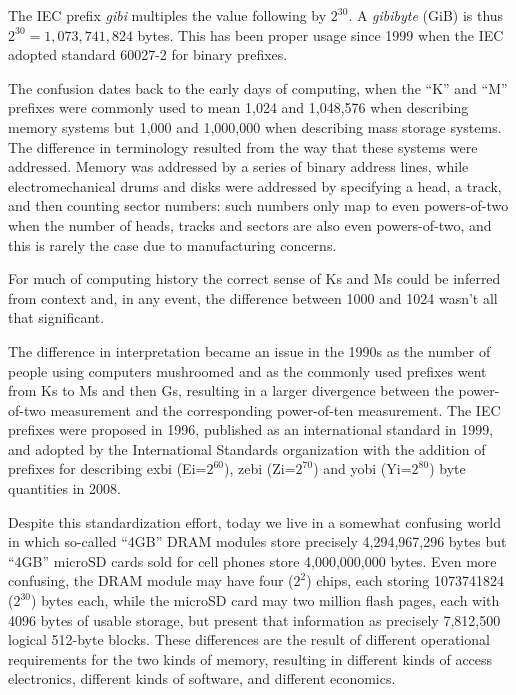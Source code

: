 The IEC prefix \emph{gibi} multiples the value following by $2^{30}$. A \emph{gibibyte}
(GiB) is thus $2^{30}=1,073,741,824$ bytes. This has been proper usage
since 1999 when the IEC adopted standard 60027-2 for binary prefixes.

The confusion dates back to the early days of computing, when the ``K''
and ``M'' prefixes were commonly used to mean 1,024 and 1,048,576
when describing memory systems but 1,000 and 1,000,000 when
describing mass storage systems. The difference in terminology resulted
from the way that these systems were addressed. Memory was addressed
by a series of binary address lines, while electromechanical drums and
disks were addressed by specifying a head, a track, and then counting
sector numbers: such numbers only map to even powers-of-two when the
number of heads, tracks and sectors are also even powers-of-two, and
this is rarely the case due to manufacturing concerns.

For much of computing history the correct sense of Ks and Ms could be
inferred from context and, in any event, the difference between 1000
and 1024 wasn't all that significant.

The difference in interpretation became an issue in the 1990s as the
number of people using computers mushroomed and as the commonly used
prefixes went from Ks to Ms and then Gs, resulting in a larger
divergence between the power-of-two measurement and the corresponding
power-of-ten measurement. The IEC prefixes were proposed in
1996\cite{iec:1996},
published as an international standard in 1999, and adopted by the
International Standards organization with the addition of prefixes for
describing exbi (Ei=$2^{60}$), zebi (Zi=$2^{70}$) and yobi (Yi=$2^{80}$) byte
quantities in 2008\cite{iec:80000-13:2008}.  

Despite this standardization effort, today we live in a somewhat
confusing world in which so-called ``4GB'' DRAM modules 
store precisely 4,294,967,296 bytes
but ``4GB'' microSD cards sold for cell
phones store 4,000,000,000 bytes. Even more confusing, the DRAM
module may have four ($2^{2}$) chips, each storing 1073741824
($2^{30}$) bytes each, while the microSD card may two million flash
pages, each with 4096 bytes of usable storage, but present that
information as precisely 7,812,500 logical 512-byte blocks.  These
differences are the result of different operational requirements for
the two kinds of memory, resulting in different kinds of access
electronics, different kinds of software, and different economics. 

